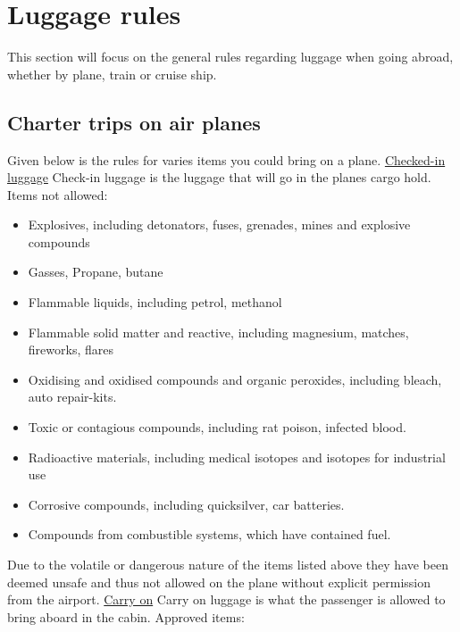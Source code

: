 \section{Luggage rules}
This section will focus on the general rules regarding luggage when going abroad, whether by plane, train or cruise ship.

\subsection{Charter trips on air planes}
Given below is the rules for varies items you could bring on a plane.
\newline
\newline
\underline{Checked-in luggage}\newline
Check-in luggage is the luggage that will go in the planes cargo hold.
\newline 
Items not allowed:
\begin{itemize}
\item Explosives, including detonators, fuses, grenades, mines and explosive compounds
\item Gasses, Propane, butane
\item Flammable liquids, including petrol, methanol
\item Flammable solid matter and reactive, including magnesium, matches, fireworks, flares
\item Oxidising and oxidised compounds and organic peroxides, including bleach, auto repair-kits.
\item Toxic or contagious compounds, including rat poison, infected blood.
\item Radioactive materials, including medical isotopes and isotopes for industrial use
\item Corrosive compounds, including quicksilver, car batteries.
\item Compounds from combustible systems, which have contained fuel.
\end{itemize}
Due to the volatile or dangerous nature of the items listed above they have been deemed unsafe and thus not allowed on the plane without explicit permission from the airport.\newline
\newline
\underline{Carry on}\newline
Carry on luggage is what the passenger is allowed to bring aboard in the cabin.
\newline
Approved items:
